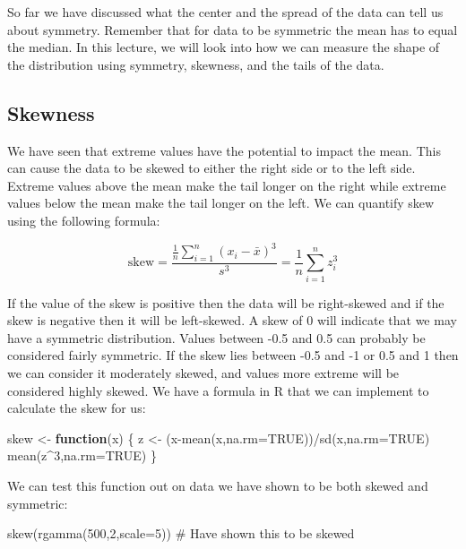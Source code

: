 \documentclass[
  letterpaper,
  DIV=11,
  numbers=noendperiod]{scrreprt}
\newenvironment{Shaded}{\begin{snugshade}}{\end{snugshade}}
\newcommand{\AttributeTok}[1]{\textcolor[rgb]{0.40,0.45,0.13}{#1}}
\newcommand{\CommentTok}[1]{\textcolor[rgb]{0.37,0.37,0.37}{#1}}
\newcommand{\ConstantTok}[1]{\textcolor[rgb]{0.56,0.35,0.01}{#1}}
\newcommand{\ControlFlowTok}[1]{\textcolor[rgb]{0.00,0.23,0.31}{\textbf{#1}}}
\newcommand{\DecValTok}[1]{\textcolor[rgb]{0.68,0.00,0.00}{#1}}
\newcommand{\FunctionTok}[1]{\textcolor[rgb]{0.28,0.35,0.67}{#1}}
\newcommand{\NormalTok}[1]{\textcolor[rgb]{0.00,0.23,0.31}{#1}}
\newcommand{\OtherTok}[1]{\textcolor[rgb]{0.00,0.23,0.31}{#1}}
\newcommand{\SpecialCharTok}[1]{\textcolor[rgb]{0.37,0.37,0.37}{#1}}
\begin{document}
So far we have discussed what the center and the spread of the data can
tell us about symmetry. Remember that for data to be symmetric the mean
has to equal the median. In this lecture, we will look into how we can
measure the shape of the distribution using symmetry, skewness, and the
tails of the data.

\subsection{Skewness}\label{skewness}

We have seen that extreme values have the potential to impact the mean.
This can cause the data to be skewed to either the right side or to the
left side. Extreme values above the mean make the tail longer on the
right while extreme values below the mean make the tail longer on the
left. We can quantify skew using the following formula:

\[ \text{skew}=\frac{\frac{1}{n}\sum_{i=1}^n (x_i - \bar{x})^3}{s^3} = \frac{1}{n} \sum_{i=1}^n z_i^3 \]

If the value of the skew is positive then the data will be right-skewed
and if the skew is negative then it will be left-skewed. A skew of 0
will indicate that we may have a symmetric distribution. Values between
-0.5 and 0.5 can probably be considered fairly symmetric. If the skew
lies between -0.5 and -1 or 0.5 and 1 then we can consider it moderately
skewed, and values more extreme will be considered highly skewed. We
have a formula in R that we can implement to calculate the skew for us:

\begin{Shaded}
\begin{Highlighting}[]
\NormalTok{skew }\OtherTok{\textless{}{-}} \ControlFlowTok{function}\NormalTok{(x) \{}
\NormalTok{            z }\OtherTok{\textless{}{-}}\NormalTok{ (x}\SpecialCharTok{{-}}\FunctionTok{mean}\NormalTok{(x,}\AttributeTok{na.rm=}\ConstantTok{TRUE}\NormalTok{))}\SpecialCharTok{/}\FunctionTok{sd}\NormalTok{(x,}\AttributeTok{na.rm=}\ConstantTok{TRUE}\NormalTok{)}
            \FunctionTok{mean}\NormalTok{(z}\SpecialCharTok{\^{}}\DecValTok{3}\NormalTok{,}\AttributeTok{na.rm=}\ConstantTok{TRUE}\NormalTok{)}
\NormalTok{\}}
\end{Highlighting}
\end{Shaded}

We can test this function out on data we have shown to be both skewed
and symmetric:

\begin{Shaded}
\begin{Highlighting}[]
\FunctionTok{skew}\NormalTok{(}\FunctionTok{rgamma}\NormalTok{(}\DecValTok{500}\NormalTok{,}\DecValTok{2}\NormalTok{,}\AttributeTok{scale=}\DecValTok{5}\NormalTok{)) }\CommentTok{\# Have shown this to be skewed}
\end{Highlighting}
\end{Shaded}
\end{document}
